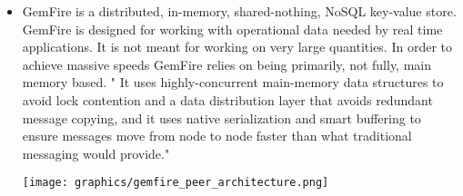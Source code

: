 \documentclass[letterpaper, 12pt]{article}
\begin{document}
\begin{itemize}
  \item GemFire is a distributed, in-memory, shared-nothing, NoSQL key-value store.
  GemFire is designed for working with operational data needed by real time
  applications. It is not meant for working on very large quantities. In order to
  achieve massive speeds GemFire relies on being primarily, not fully,
  main memory based. " It uses highly-concurrent main-memory data structures to avoid
  lock contention and a data distribution
  layer that avoids redundant message copying, and it uses native serialization and
  smart buffering to ensure messages move from node to node faster than what
  traditional messaging would provide."\cite{gemfire}
  \par\vspace{\baselineskip}
  \texttt{[image: graphics/gemfire\_peer\_architecture.png]}
  \par\vspace{\baselineskip}


\end{itemize}
\end{document}
